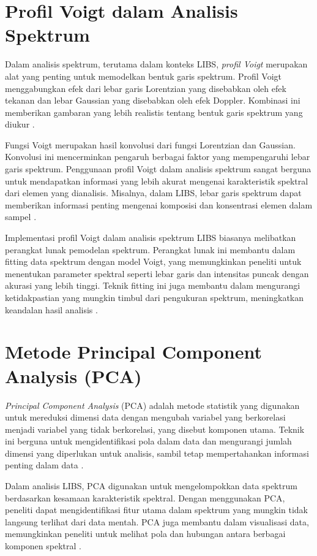 \section{Profil Voigt dalam Analisis Spektrum}
\par Dalam analisis spektrum, terutama dalam konteks LIBS, \textit{profil Voigt} merupakan alat yang penting untuk memodelkan bentuk garis spektrum. Profil Voigt menggabungkan efek dari lebar garis Lorentzian yang disebabkan oleh efek tekanan dan lebar Gaussian yang disebabkan oleh efek Doppler. Kombinasi ini memberikan gambaran yang lebih realistis tentang bentuk garis spektrum yang diukur \citep{voigt1929}.

\par Fungsi Voigt merupakan hasil konvolusi dari fungsi Lorentzian dan Gaussian. Konvolusi ini mencerminkan pengaruh berbagai faktor yang mempengaruhi lebar garis spektrum. Penggunaan profil Voigt dalam analisis spektrum sangat berguna untuk mendapatkan informasi yang lebih akurat mengenai karakteristik spektral dari elemen yang dianalisis. Misalnya, dalam LIBS, lebar garis spektrum dapat memberikan informasi penting mengenai komposisi dan konsentrasi elemen dalam sampel \citep{jeong2002}.

\par Implementasi profil Voigt dalam analisis spektrum LIBS biasanya melibatkan perangkat lunak pemodelan spektrum. Perangkat lunak ini membantu dalam fitting data spektrum dengan model Voigt, yang memungkinkan peneliti untuk menentukan parameter spektral seperti lebar garis dan intensitas puncak dengan akurasi yang lebih tinggi. Teknik fitting ini juga membantu dalam mengurangi ketidakpastian yang mungkin timbul dari pengukuran spektrum, meningkatkan keandalan hasil analisis \citep{smith2013}.

\section{Metode Principal Component Analysis (PCA)}
\par \textit{Principal Component Analysis} (PCA) adalah metode statistik yang digunakan untuk mereduksi dimensi data dengan mengubah variabel yang berkorelasi menjadi variabel yang tidak berkorelasi, yang disebut komponen utama. Teknik ini berguna untuk mengidentifikasi pola dalam data dan mengurangi jumlah dimensi yang diperlukan untuk analisis, sambil tetap mempertahankan informasi penting dalam data \citep{jolliffe2002}.

\par Dalam analisis LIBS, PCA digunakan untuk mengelompokkan data spektrum berdasarkan kesamaan karakteristik spektral. Dengan menggunakan PCA, peneliti dapat mengidentifikasi fitur utama dalam spektrum yang mungkin tidak langsung terlihat dari data mentah. PCA juga membantu dalam visualisasi data, memungkinkan peneliti untuk melihat pola dan hubungan antara berbagai komponen spektral \citep{martin2014}.

